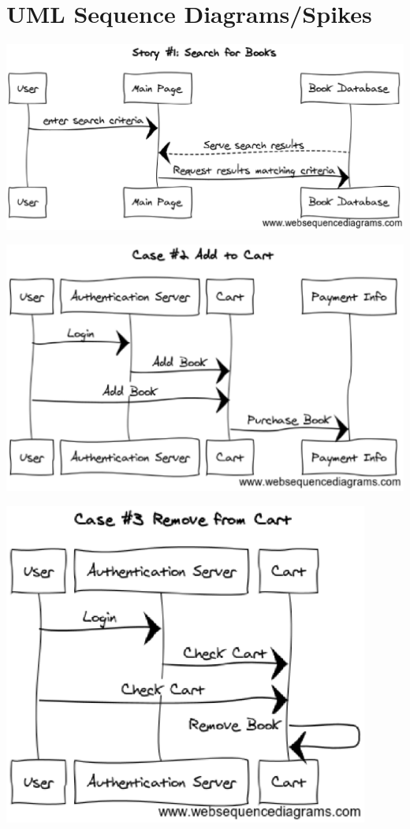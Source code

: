 \documentclass[12pt]{article}
\begin{document}
	\section{UML Sequence Diagrams/Spikes}
		\includegraphics[width=16cm]{story1.eps}
		\par
		\includegraphics[width=14cm]{story2.eps}
		\par
		\includegraphics[width=12cm]{story3.eps}
\end{document}
